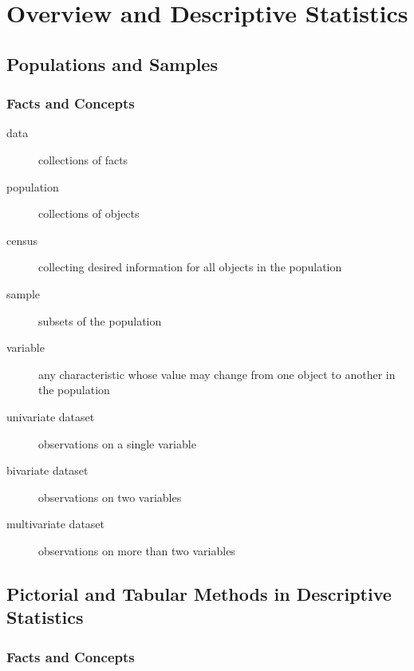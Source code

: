 
\chapter{Overview and Descriptive Statistics}

\section{Populations and Samples}

\subsection{Facts and Concepts}

\begin{description}
	\item[data] collections of facts
	\item[population] collections of objects
	\item[census] collecting desired information for all objects in the population
	\item[sample] subsets of the population
	\item[variable] any characteristic whose value may change from one object to another in the population
	\item[univariate dataset] observations on a single variable
	\item[bivariate dataset] observations on two variables
	\item[multivariate dataset] observations on more than two variables
\end{description}

\section{Pictorial and Tabular Methods in Descriptive Statistics}

\subsection{Facts and Concepts}

